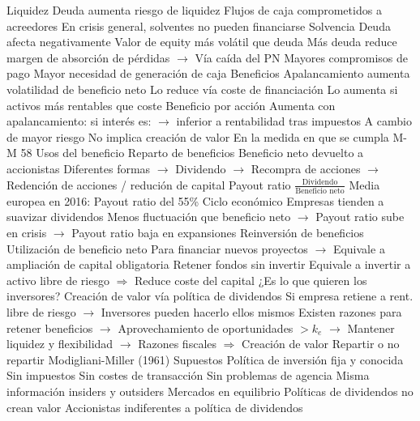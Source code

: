 \documentclass{nuevotema}
\begin{document}
\begin{esquemal}
			\3 Liquidez
				\4 Deuda aumenta riesgo de liquidez
				\4[] Flujos de caja comprometidos a acreedores
				\4 En crisis general, solventes no pueden financiarse
			\3 Solvencia
				\4 Deuda afecta negativamente
				\4[] Valor de equity más volátil que deuda
				\4[] Más deuda reduce margen de absorción de pérdidas
				\4[] $\to$ Vía caída del PN
				\4[$\to$] Mayores compromisos de pago
				\4[$\to$] Mayor necesidad de generación de caja
			\3 Beneficios
				\4 Apalancamiento aumenta volatilidad de beneficio neto
				\4[] Lo reduce vía coste de financiación
				\4[] Lo aumenta si activos más rentables que coste
			\3 Beneficio por acción
				\4 Aumenta con apalancamiento:
				\4[] si interés es:
				\4[] $\to$ inferior a rentabilidad tras impuestos
				\4 A cambio de mayor riesgo
				\4 No implica creación de valor
				\4[] En la medida en que se cumpla M-M 58
	\1 
		\2 Usos del beneficio
			\3 Reparto de beneficios
				\4 Beneficio neto devuelto a accionistas
				\4[] Diferentes formas
				\4[] $\to$ Dividendo
				\4[] $\to$ Recompra de acciones
				\4[] $\to$ Redención de acciones / redución de capital
				\4 Payout ratio
				\4[] $\frac{\text{Dividendo}}{\text{Beneficio neto}}$
				\4 Media europea en 2016:
				\4[] Payout ratio del 55\%
				\4 Ciclo económico
				\4[] Empresas tienden a suavizar dividendos
				\4[] Menos fluctuación que beneficio neto
				\4[] $\to$ Payout ratio sube en crisis
				\4[] $\to$ Payout ratio baja en expansiones
			\3 Reinversión de beneficios
				\4 Utilización de beneficio neto
				\4[] Para financiar nuevos proyectos
				\4[] $\to$ Equivale a ampliación de capital obligatoria
				\4 Retener fondos sin invertir
				\4[] Equivale a invertir a activo libre de riesgo
				\4[] $\Rightarrow$ Reduce coste del capital
				\4 ¿Es lo que quieren los inversores?
			\3 Creación de valor vía política de dividendos
				\4 Si empresa retiene a rent. libre de riesgo
				\4[] $\to$ Inversores pueden hacerlo ellos mismos
				\4 Existen razones para retener beneficios
				\4[] $\to$ Aprovechamiento de oportunidades $> k_e$
				\4[] $\to$ Mantener liquidez y flexibilidad
				\4[] $\to$ Razones fiscales
				\4[] $\Rightarrow$ Creación de valor
		\2 Repartir o no repartir
			\3 Modigliani-Miller (1961)
				\4 Supuestos
				\4[] Política de inversión fija y conocida
				\4[] Sin impuestos
				\4[] Sin costes de transacción
				\4[] Sin problemas de agencia
				\4[] Misma información insiders y outsiders
				\4[] Mercados en equilibrio
				\4 Políticas de dividendos no crean valor
				\4[] Accionistas indiferentes a política de dividendos

\end{esquemal}
\end{document}
